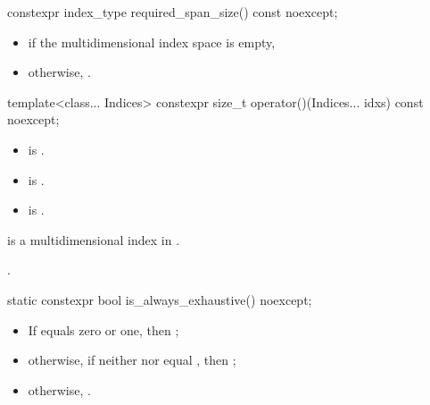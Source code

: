 \begin{itemdecl}
constexpr index_type required_span_size() const noexcept;
\end{itemdecl}

\begin{itemdescr}
\pnum
\returns
\begin{itemize}
\item
{} if the multidimensional index space  is empty,
\item
otherwise, .
\end{itemize}
\end{itemdescr}

\begin{itemdecl}
template<class... Indices>
constexpr size_t operator()(Indices... idxs) const noexcept;
\end{itemdecl}

\begin{itemdescr}
\pnum
\constraints
\begin{itemize}
\item
{} is .
\item
{} is .
\item
{} is .
\end{itemize}

\pnum
\expects
{} is
a multidimensional index in .

\pnum
\returns
{}.
\end{itemdescr}

\begin{itemdecl}
static constexpr bool is_always_exhaustive() noexcept;
\end{itemdecl}

\begin{itemdescr}
\pnum
\returns
\begin{itemize}
\item
If  equals zero or one, then ;
\item
otherwise, if
neither  nor 
equal ,
then ;
\item
otherwise, .
\end{itemize}
\end{itemdescr}

